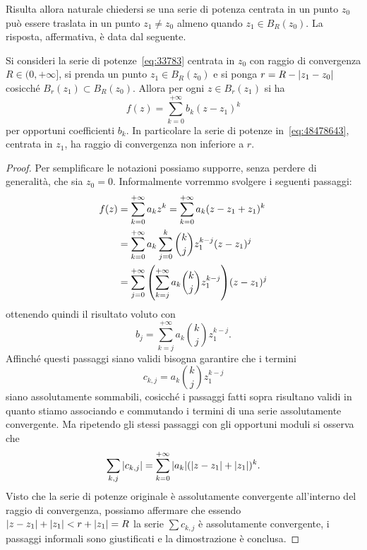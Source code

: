 Risulta allora naturale chiedersi se una serie di potenza centrata in un punto $z_0$
può essere traslata in un punto $z_1\neq z_0$ almeno quando $z_1 \in B_R(z_0)$.
La risposta, affermativa, è data dal seguente.

\begin{theorem}
\label{th:488456367}
Si consideri la serie di potenze~\eqref{eq:33783} centrata in $z_0$
con raggio di convergenza
$R\in (0,+\infty]$, si prenda un punto $z_1 \in B_R(z_0)$
e si ponga $r=R-{\left|z_1-z_0\right|}$ cosicché $B_r(z_1)\subset B_R(z_0)$.
Allora
per ogni $z\in B_r(z_1)$ si ha
\begin{equation}\label{eq:48478643}
  f(z) = \sum_{k=0}^{+\infty} b_k (z - z_1)^k
\end{equation}
per opportuni coefficienti $b_k$. In particolare la serie
di potenze in~\eqref{eq:48478643}, centrata in $z_1$,
ha raggio di convergenza non inferiore a $r$.
\end{theorem}
%
\begin{proof}
Per semplificare le notazioni possiamo supporre, senza perdere di generalità,
che sia $z_0=0$.
Informalmente vorremmo svolgere i seguenti passaggi:
\begin{align*}
  f(z)
  &= \sum_{k=0}^{+\infty} a_k z^k
  = \sum_{k=0}^{+\infty} a_k (z-z_1+z_1)^k \\
  &= \sum_{k=0}^{+\infty} a_k \sum_{j=0}^k {k \choose j} z_1^{k-j}(z-z_1)^j\\
  &= \sum_{j=0}^{+\infty} {\left( \sum_{k=j}^{+\infty} a_k{k \choose j} z_1^{k-j} \right)} (z-z_1)^j
\end{align*}
ottenendo quindi il risultato voluto con
\[
  b_j = \sum_{k=j}^{+\infty} a_k{k \choose j} z_1^{k-j}.
\]
Affinché questi passaggi siano validi bisogna garantire che i termini
\[
  c_{k,j} = a_k {k \choose j} z_1^{k-j}
\]
siano assolutamente sommabili, cosicché i passaggi fatti sopra risultano
validi in quanto stiamo associando e commutando i termini di una serie
assolutamente convergente. Ma ripetendo gli stessi passaggi con gli
opportuni moduli si osserva che
\[
  \sum_{k,j} {\left|c_{k,j}\right|} = \sum_{k=0}^{+\infty} {\left|a_k\right|}({\left|z-z_1\right|}+{\left|z_1\right|})^k.
\]
Visto che la serie di potenze originale è assolutamente convergente
all'interno del raggio di convergenza, possiamo affermare che essendo
${\left|z-z_1\right|}+{\left|z_1\right|} < r + {\left|z_1\right|} = R$
la serie $\sum c_{k,j}$ è assolutamente convergente,
i passaggi informali sono giustificati e la dimostrazione è conclusa.
\end{proof}


